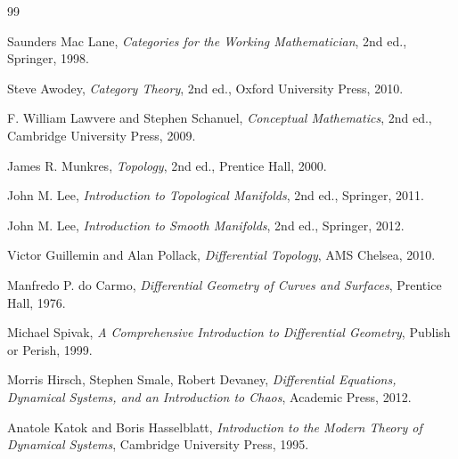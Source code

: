 \documentclass[11pt,oneside]{book}
\numberwithin{equation}{chapter}
\theoremstyle{definition}
\theoremstyle{plain}
\begin{document}
\newpage

\begin{thebibliography}{99}


Saunders Mac Lane,
\emph{Categories for the Working Mathematician},
2nd ed.,
Springer,
1998.

Steve Awodey,
\emph{Category Theory},
2nd ed.,
Oxford University Press,
2010.

F. William Lawvere and Stephen Schanuel,
\emph{Conceptual Mathematics},
2nd ed.,
Cambridge University Press,
2009.


James R. Munkres,
\emph{Topology},
2nd ed.,
Prentice Hall,
2000.

John M. Lee,
\emph{Introduction to Topological Manifolds},
2nd ed.,
Springer,
2011.

John M. Lee,
\emph{Introduction to Smooth Manifolds},
2nd ed.,
Springer,
2012.

Victor Guillemin and Alan Pollack,
\emph{Differential Topology},
AMS Chelsea,
2010.


Manfredo P. do Carmo,
\emph{Differential Geometry of Curves and Surfaces},
Prentice Hall,
1976.

Michael Spivak,
\emph{A Comprehensive Introduction to Differential Geometry},
Publish or Perish,
1999.


Morris Hirsch,
Stephen Smale,
Robert Devaney,
\emph{Differential Equations, Dynamical Systems, and an Introduction to Chaos},
Academic Press,
2012.

Anatole Katok and Boris Hasselblatt,
\emph{Introduction to the Modern Theory of Dynamical Systems},
Cambridge University Press,
1995.


\end{thebibliography}
\end{document}
